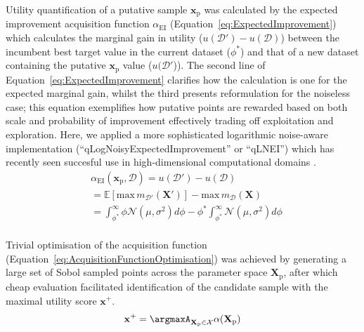 Utility quantification of a putative sample \(\mathbf{x}_{\mathrm{p}}\) was
 calculated by the expected improvement acquisition function
 \(\alpha_{\mathrm{EI}}\) (Equation~\ref{eq:ExpectedImprovement}) which calculates
 the marginal gain in utility (\(u(\mathcal{D'})-u(\mathcal{D})\)) between
 the incumbent best target value in the current dataset (\(\phi^{*}\)) and
 that of a new dataset containing the putative \(\mathbf{x}_{\mathrm{p}}\) value
 (\(u(\mathcal{D'}\))).
The second line of Equation~\ref{eq:ExpectedImprovement} clarifies how the
 calculation is one for the expected marginal gain, whilst the third
 presents reformulation for the noiseless case; this equation exemplifies
 how putative points are rewarded based on both scale and probability of
 improvement effectively trading off exploitation and exploration.
Here, we applied a more sophisticated logarithmic noise-aware
 implementation (``qLogNoisyExpectedImprovement'' or ``qLNEI'') which has
 recently seen succesful use in high-dimensional computational domains
 \autocite{Ament2025}.
\footnotesize
\begin{equation}\label{eq:ExpectedImprovement}
    \begin{split}
        &\alpha_{\mathrm{EI}}(\mathbf{x}_{\mathrm{p}},\mathcal{D})=u(\mathcal{D'})-u(\mathcal{D})\\
        &=\mathbb{E}[\mathrm{max}\,m_{\mathcal{D}'}(\mathbf{X}')]-\mathrm{max}\,m_{\mathcal{D}}(\mathbf{X})\\
        &=\int_{\phi^{*}}^{\infty}\phi\mathcal{N}(\mu,\sigma^{2})d\phi-\phi^{*}\int_{\phi^{*}}^{\infty}\mathcal{N}(\mu,\sigma^{2})d\phi\\
    \end{split}
\end{equation}
\normalsize

Trivial optimisation of the acquisition function
(Equation~\ref{eq:AcquisitionFunctionOptimisation}) was achieved by
 generating a large set of Sobol sampled points across the parameter space
 \(\mathbf{X}_{\mathrm{p}}\), after which cheap evaluation facilitated identification of
 the candidate sample with the maximal utility score \(\mathbf{x}^{+}\).
\begin{equation}\label{eq:AcquisitionFunctionOptimisation}
    \mathbf{x}^{+}=\argmaxA_{\mathbf{X}_{\mathrm{p}}\in\mathcal{X}}\alpha(\mathbf{X}_{\mathrm{p}})
\end{equation}

